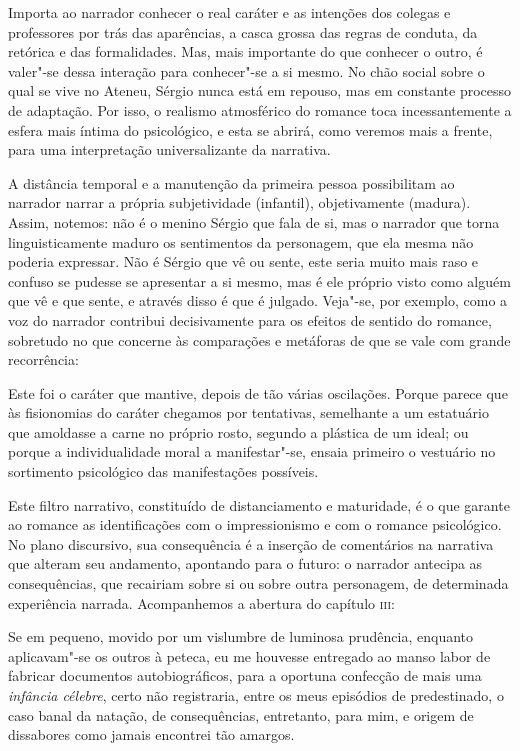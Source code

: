 Importa ao narrador conhecer o real caráter e as intenções dos colegas e
professores por trás das aparências, a casca grossa das regras de
conduta, da retórica e das formalidades. Mas, mais importante do que
conhecer o outro, é valer"-se dessa interação para conhecer"-se a si
mesmo. No chão social sobre o qual se vive no Ateneu, Sérgio nunca está
em repouso, mas em constante processo de adaptação. Por isso, o
realismo atmosférico do romance toca incessantemente a esfera mais
íntima do psicológico, e esta se abrirá, como veremos mais a frente,
para uma interpretação universalizante da narrativa. 

A distância temporal e a manutenção da primeira pessoa possibilitam ao
narrador narrar a própria subjetividade (infantil), objetivamente
(madura). Assim, notemos: não é o menino Sérgio que fala de si, mas o
narrador que torna linguisticamente maduro os sentimentos da
personagem, que ela mesma não poderia expressar. Não é Sérgio que vê ou
sente, este seria muito mais raso e confuso se pudesse se apresentar a
si mesmo, mas é ele próprio visto como alguém que vê e que sente, e
através disso é que é julgado. Veja"-se, por exemplo, como a voz do
narrador contribui decisivamente para os efeitos de sentido do romance,
sobretudo no que concerne às comparações e metáforas de que se vale com
grande recorrência: 

\begin{hedraquote}
Este foi o caráter que mantive, depois de tão várias oscilações. Porque
parece que às fisionomias do caráter chegamos por tentativas,
semelhante a um estatuário que amoldasse a carne no próprio rosto,
segundo a plástica de um ideal; ou porque a individualidade moral a
manifestar"-se, ensaia primeiro o vestuário no sortimento psicológico
das manifestações possíveis. 
\end{hedraquote}

Este filtro narrativo, constituído de distanciamento e maturidade, é o
que garante ao romance as identificações com o impressionismo e com o
romance psicológico. No plano discursivo, sua consequência é a inserção
de comentários na narrativa que alteram seu andamento, apontando para o
futuro: o narrador antecipa as consequências, que recairiam sobre si ou
sobre outra personagem, de determinada experiência narrada.
Acompanhemos a abertura do capítulo \textsc{iii}:

\begin{hedraquote}
Se em pequeno, movido por um vislumbre de luminosa
prudência, enquanto aplicavam"-se os outros à peteca, eu me houvesse
entregado ao manso labor de fabricar documentos autobiográficos, para a
oportuna confecção de mais uma \textit{infância
célebre}, certo não registraria, entre os meus
episódios de predestinado, o caso banal da natação, de consequências,
entretanto, para mim, e origem de dissabores como jamais encontrei tão amargos.
\end{hedraquote}

